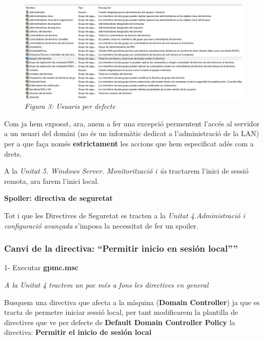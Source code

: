 \documentclass[
  a4paper,
]{article}
\begin{document}
\begin{figure}
\centering
\includegraphics{png/usuarisDefecteWS.png}
\caption{\emph{Figura 3: Usuaris per defecte}}
\end{figure}

Com ja hem exposat, ara, anem a fer una excepció permentent l'accés al
servidor a un usuari del domini (no és un informàtic dedicat a
l'administració de la LAN) per a que faça només \textbf{estrictament}
les accions que hem especificat adés com a drets.

A la \emph{Unitat 5. Windows Server. Monitorització i ús} tractarem
l'inici de sessió remota, ara farem l'inici local.

\textbf{Spoiler: directiva de seguretat}

Tot i que les Directives de Seguretat es tracten a la \emph{Unitat
4.Administració i configuració avançada} s'imposa la necessitat de fer
un spoiler.

\subsubsection{\texorpdfstring{Canvi de la directiva: ``Permitir inicio
en sesión
local''''}{Canvi de la directiva: ``Permitir inicio en sesión local''\,''}}\label{canvi-de-la-directiva-permitir-inicio-en-sesiuxf3n-local}

1- Executar \textbf{gpmc.msc}

\emph{A la Unitat 4 tractem un poc més a fons les directives en general}

Busquem una directiva que afecta a la màquina (\textbf{Domain
Controller}) ja que es tracta de permetre iniciar sessió local, per tant
modificarem la plantilla de directives que ve per defecte de
\textbf{Default Domain Controller Policy} la directiva: \textbf{Permitir
el inicio de sesión local}
\end{document}
